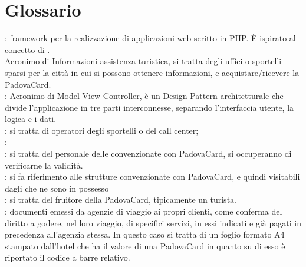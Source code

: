 \section{Glossario}
: framework per la realizzazione di applicazioni web scritto in PHP. È ispirato al concetto di . \\
 Acronimo di Informazioni assistenza turistica, si tratta degli uffici o sportelli sparsi per la città in cui si possono ottenere informazioni, e acquistare/ricevere la PadovaCard. \\
: Acronimo di Model View Controller, è un Design Pattern architetturale che divide l’applicazione in tre parti interconnesse, separando l’interfaccia utente, la logica e i dati. \\
: si tratta di operatori degli sportelli  o del call center;\\
:  \\
: si tratta del personale delle  convenzionate con PadovaCard, si occuperanno di verificarne la validità. \\
: si fa riferimento alle strutture convenzionate con PadovaCard, e quindi visitabili dagli  che ne sono in possesso \\
: si tratta del fruitore della PadovaCard, tipicamente un turista.\\
: documenti emessi da agenzie di viaggio ai propri clienti, come conferma del diritto a godere, nel loro viaggio, di specifici servizi, in essi indicati e già pagati in precedenza all'agenzia stessa. In questo caso si tratta di un foglio formato A4 stampato dall'hotel che ha il valore di una PadovaCard in quanto su di esso è riportato il codice a barre relativo. \\
